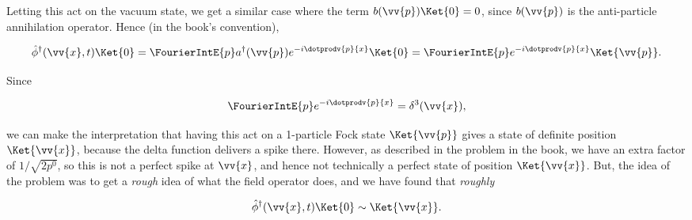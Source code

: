 \begin{parts}
Letting this act on the vacuum state, we get a similar case where the term $b(\vv{p})\Ket{0}=0$, since $b(\vv{p})$ is the anti-particle annihilation operator. Hence (in the book's convention),

\begin{equation*}
    \hat{\phi}^{\dagger}(\vv{x},t)\Ket{0} = \FourierIntE{p} a^{\dagger}(\vv{p})e^{-i\dotprodv{p}{x}} \Ket{0} = \FourierIntE{p} e^{-i\dotprodv{p}{x}} \Ket{\vv{p}}.
\end{equation*}

Since 

\begin{equation*}
    \FourierIntE{p} e^{-i\dotprodv{p}{x}} = \delta^3(\vv{x}),
\end{equation*}

we can make the interpretation that having this act on a 1-particle Fock state $\Ket{\vv{p}}$ gives a state of definite position $\Ket{\vv{x}}$, because the delta function delivers a spike there. However, as described in the problem in the book, we have an extra factor of $1/\sqrt{2p^0}$, so this is not a perfect spike at $\vv{x}$, and hence not technically a perfect state of position $\Ket{\vv{x}}$. But, the idea of the problem was to get a \textit{rough} idea of what the field operator does, and we have found that \textit{roughly}

\begin{equation*}
    \hat{\phi}^{\dagger}(\vv{x},t)\Ket{0} \sim \Ket{\vv{x}}.
\end{equation*}

\end{parts}